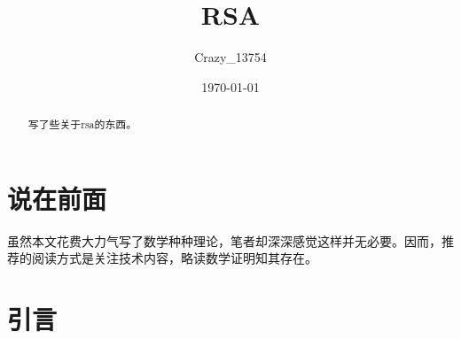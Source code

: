 \documentclass[a4paper]{article}  %
\title{\heiti\zihao{2} RSA}
\author{\songti Crazy\_13754}
\date{\today}
\newcommand{\upcite}[1]{\textsuperscript{\textsuperscript{\cite{#1}}}} %
\begin{document}
\begin{sloppypar} %

\maketitle
\begin{abstract}
	写了些关于rsa的东西。
\end{abstract}
\tableofcontents
\section{说在前面}
虽然本文花费大力气写了数学种种理论，笔者却深深感觉这样并无必要。因而，推荐的阅读方式是关注技术内容，略读数学证明知其存在。

\section[引言]{引言}






\end{sloppypar}
\end{document}
